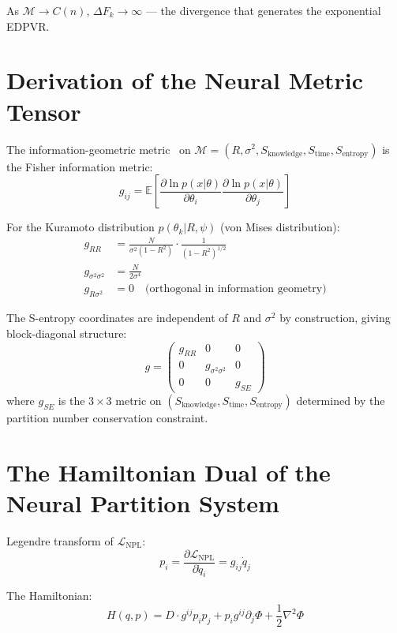 \documentclass[10pt,twocolumn,a4paper]{article}
\theoremstyle{definition}
\newcommand{\SE}{S_{\text{entropy}}}
\newcommand{\SK}{S_{\text{knowledge}}}
\newcommand{\ST}{S_{\text{time}}}
\newcommand{\calM}{\mathcal{M}}
\newcommand{\LNPL}{\mathcal{L}_{\text{NPL}}}
\begin{document}
As $\mathcal{M} \to C(n)$, $\Delta F_k \to \infty$ — the divergence that
generates the exponential EDPVR.

\section{Derivation of the Neural Metric Tensor}
\label{app:metric}

The information-geometric metric~\cite{amari2016information,fisher1925theory} on $\calM = (R, \sigma^2, \SK, \ST, \SE)$
is the Fisher information metric:
\begin{equation}
g_{ij} = \mathbb{E}\left[\frac{\partial \ln p(x|\theta)}{\partial \theta_i}
\frac{\partial \ln p(x|\theta)}{\partial \theta_j}\right]
\end{equation}

For the Kuramoto distribution $p(\theta_k | R, \psi)$ (von Mises distribution):
\begin{align}
g_{RR} &= \frac{N}{\sigma^2(1-R^2)} \cdot \frac{1}{(1-R^2)^{1/2}}\\
g_{\sigma^2\sigma^2} &= \frac{N}{2\sigma^4}\\
g_{R\sigma^2} &= 0 \quad \text{(orthogonal in information geometry)}
\end{align}

The S-entropy coordinates are independent of $R$ and $\sigma^2$ by construction,
giving block-diagonal structure:
\begin{equation}
g = \begin{pmatrix} g_{RR} & 0 & 0 \\ 0 & g_{\sigma^2\sigma^2} & 0 \\ 0 & 0 & g_{SE} \end{pmatrix}
\end{equation}
where $g_{SE}$ is the $3\times 3$ metric on $(\SK, \ST, \SE)$ determined by
the partition number conservation constraint.

\section{The Hamiltonian Dual of the Neural Partition System}
\label{app:hamiltonian}

Legendre transform of $\LNPL$:
\begin{equation}
p_i = \frac{\partial \LNPL}{\partial \dot{q}_i} = g_{ij}\dot{q}_j
\end{equation}

The Hamiltonian:
\begin{equation}
H(q,p) = D \cdot g^{ij} p_i p_j + p_i g^{ij} \partial_j \Phi + \frac{1}{2}\nabla^2\Phi
\end{equation}
\end{document}
